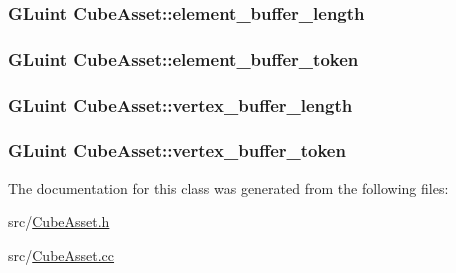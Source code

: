 \subsubsection[{element\+\_\+buffer\+\_\+length}]{\setlength{\rightskip}{0pt plus 5cm}G\+Luint Cube\+Asset\+::element\+\_\+buffer\+\_\+length\hspace{0.3cm}{\ttfamily [private]}}\label{classCubeAsset_ac66c2ec869f392515dad4ebda1fe4792}
\hypertarget{classCubeAsset_a4fae699256e7c5633a8174a93ca8a0ec}{}
\subsubsection[{element\+\_\+buffer\+\_\+token}]{\setlength{\rightskip}{0pt plus 5cm}G\+Luint Cube\+Asset\+::element\+\_\+buffer\+\_\+token\hspace{0.3cm}{\ttfamily [private]}}\label{classCubeAsset_a4fae699256e7c5633a8174a93ca8a0ec}
\hypertarget{classCubeAsset_a3054ed8a7d6cc1575aebdfc40038847b}{}
\subsubsection[{vertex\+\_\+buffer\+\_\+length}]{\setlength{\rightskip}{0pt plus 5cm}G\+Luint Cube\+Asset\+::vertex\+\_\+buffer\+\_\+length\hspace{0.3cm}{\ttfamily [private]}}\label{classCubeAsset_a3054ed8a7d6cc1575aebdfc40038847b}
\hypertarget{classCubeAsset_a31bd098f60e2c24988316a9cc9335987}{}
\subsubsection[{vertex\+\_\+buffer\+\_\+token}]{\setlength{\rightskip}{0pt plus 5cm}G\+Luint Cube\+Asset\+::vertex\+\_\+buffer\+\_\+token\hspace{0.3cm}{\ttfamily [private]}}\label{classCubeAsset_a31bd098f60e2c24988316a9cc9335987}


The documentation for this class was generated from the following files\+:\begin{DoxyCompactItemize}
\item 
src/\hyperlink{CubeAsset_8h}{Cube\+Asset.\+h}\item 
src/\hyperlink{CubeAsset_8cc}{Cube\+Asset.\+cc}\end{DoxyCompactItemize}
